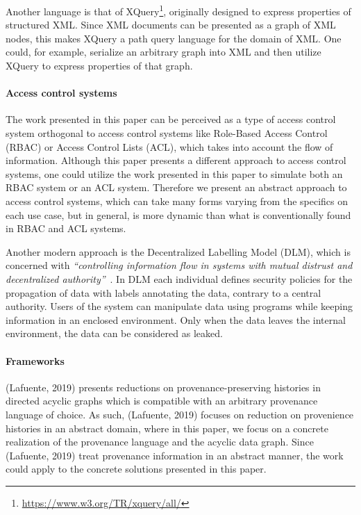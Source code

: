 Another language is that of XQuery\footnote{\href{https://www.w3.org/TR/xquery/all/}{https://www.w3.org/TR/xquery/all/}}, originally designed to express properties of structured XML. Since XML documents can be presented as a graph of XML nodes, this makes XQuery a path query language for the domain of XML. One could, for example, serialize an arbitrary graph into XML and then utilize XQuery to express properties of that graph.

\paragraph{Access control systems}
The work presented in this paper can be perceived as a type of access control system orthogonal to access control systems like Role-Based Access Control (RBAC) or Access Control Lists (ACL), which takes into account the flow of information. Although this paper presents a different approach to access control systems, one could utilize the work presented in this paper to simulate both an RBAC system or an ACL system. Therefore we present an abstract approach to access control systems, which can take many forms varying from the specifics on each use case, but in general, is more dynamic than what is conventionally found in RBAC and ACL systems.

Another modern approach is the Decentralized Labelling Model (DLM), which is concerned with \emph{``controlling information flow in systems with mutual distrust and decentralized authority''}~\cite{myers1997decentralized}. In DLM each individual defines security policies for the propagation of data with labels annotating the data, contrary to a central authority. Users of the system can manipulate data using programs while keeping information in an enclosed environment. Only when the data leaves the internal environment, the data can be considered as leaked.

\paragraph{Frameworks} (Lafuente, 2019)\cite{lafuente2019framework} presents reductions on provenance-preserving histories in directed acyclic graphs which is compatible with an arbitrary provenance language of choice. As such, (Lafuente, 2019)\cite{lafuente2019framework} focuses on reduction on provenience histories in an abstract domain, where in this paper, we focus on a concrete realization of the provenance language and the acyclic data graph. Since (Lafuente, 2019)\cite{lafuente2019framework} treat provenance information in an abstract manner, the work could apply to the concrete solutions presented in this paper.